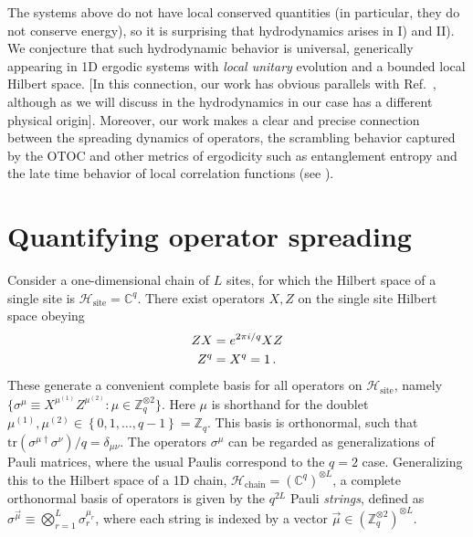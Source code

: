 \documentclass[aps,prb,twocolumn,superscriptaddress]{revtex4-1}
\begin{document}
The systems above do not have local conserved quantities (in particular, they do not conserve energy), so it is surprising that hydrodynamics arises in I) and II).  We conjecture that such hydrodynamic behavior is universal, generically appearing in 1D ergodic systems with \textit{local unitary} evolution and a bounded local Hilbert space. [In this connection, our work has obvious parallels with Ref.~, although as we will discuss in  the hydrodynamics in our case has a different physical origin]. Moreover, our work makes a clear and precise connection between the spreading dynamics of operators, the scrambling behavior captured by the OTOC and other metrics of ergodicity such as entanglement entropy and the late time behavior of local correlation functions (see ).

\section{Quantifying operator spreading}\label{s:QuantifyOperatorSpread}

Consider a one-dimensional chain of $L$ sites, for which the Hilbert space of a single site is $\mathcal{H}_\text{site}=\mathbb{C}^{q}$.
There exist operators $X,Z$ on the single site Hilbert space obeying
\begin{subequations}
\begin{align}
ZX & = e^{2\pi i/q}XZ\\
Z^{q} & =X^{q} =1\,.
\end{align}
\end{subequations}
These generate a convenient complete basis for all operators on $\mathcal{H}_\text{site}$, namely $\{ \sigma^{\mu}\equiv X^{\mu^{(1)}}Z^{\mu^{(2)}}:\mu\in\mathbb{Z}_{q}^{\otimes2}\} $. Here $\mu$ is shorthand for the doublet $\mu^{(1)},\mu^{(2)}\in\left\{ 0,1,\ldots,q-1\right\} =\mathbb{Z}_{q}$. This basis is orthonormal, such that $\mathrm{tr}(\sigma^{\mu\dagger}\sigma^\nu) / q = \delta_{\mu\nu}$. The operators $\sigma^\mu$ can be regarded as generalizations of Pauli matrices, where the usual Paulis correspond to the $q=2$ case. Generalizing this to the Hilbert space of a 1D chain, $\mathcal{H}_\text{chain}=\left(\mathbb{C}^{q}\right)^{\otimes L}$, a complete orthonormal basis of operators is given by the $q^{2L}$ Pauli \emph{strings}, defined as $\sigma^{\vec{\mu}}\equiv\bigotimes_{r=1}^{L}\sigma_{r}^{\mu_{r}}$, where each string is indexed by a vector $\vec{\mu}\in\left(\mathbb{Z}_{q}^{\otimes2}\right)^{\otimes L}$.
\end{document}
